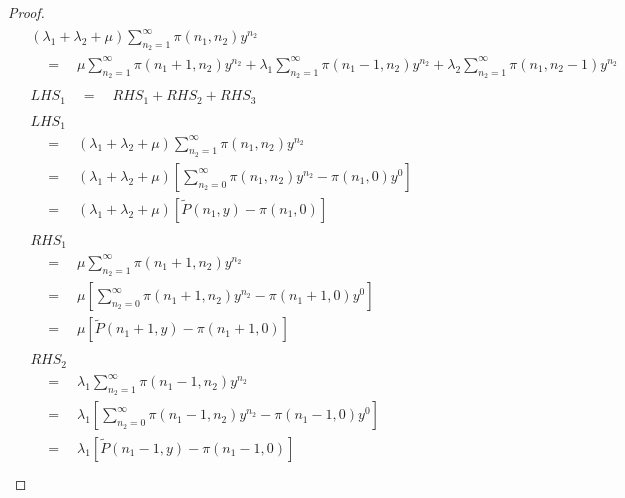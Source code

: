 \begin{proof}
    \begin{align}
        \begin{split}
            & (\lambda_1+\lambda_2+\mu)\sum_{n_2=1}^{\infty}\pi(n_1,n_2)y^{n_2} \\
            & \quad = \quad \mu\sum_{n_2=1}^{\infty}\pi(n_1+1,n_2)y^{n_2} + \lambda_1\sum_{n_2=1}^{\infty}\pi(n_1-1,n_2)y^{n_2} + \lambda_2\sum_{n_2=1}^{\infty}\pi(n_1,n_2-1)y^{n_2}
        \end{split} \nonumber \\
        \begin{split}
            & LHS_1 \quad = \quad RHS_1 + RHS_2 + RHS_3
        \end{split} \nonumber \\
        \begin{split}
            & LHS_1 \\
            & \quad = \quad (\lambda_1+\lambda_2+\mu)\sum_{n_2=1}^{\infty}\pi(n_1,n_2)y^{n_2} \\
            & \quad = \quad (\lambda_1+\lambda_2+\mu) \left[ \sum_{n_2=0}^{\infty}\pi(n_1,n_2)y^{n_2} - \pi(n_1,0)y^0 \right] \\
            & \quad = \quad (\lambda_1+\lambda_2+\mu) \left[ \widetilde{P}(n_1,y) - \pi(n_1,0) \right]
        \end{split} \nonumber \\
        \begin{split}
            & RHS_1 \\
            & \quad = \quad \mu\sum_{n_2=1}^{\infty}\pi(n_1+1,n_2)y^{n_2} \\
            & \quad = \quad \mu \left[ \sum_{n_2=0}^{\infty}\pi(n_1+1,n_2)y^{n_2} - \pi(n_1+1,0)y^0 \right] \\
            & \quad = \quad \mu \left[ \widetilde{P}(n_1+1,y) - \pi(n_1+1,0) \right]
        \end{split} \nonumber \\
        \begin{split}
            & RHS_2 \\
            & \quad = \quad \lambda_1\sum_{n_2=1}^{\infty}\pi(n_1-1,n_2)y^{n_2} \\
            & \quad = \quad \lambda_1 \left[ \sum_{n_2=0}^{\infty}\pi(n_1-1,n_2)y^{n_2} - \pi(n_1-1,0)y^0 \right] \\
            & \quad = \quad \lambda_1 \left[ \widetilde{P}(n_1-1,y) - \pi(n_1-1,0) \right]
        \end{split} \nonumber \\

\end{align}
\end{proof}
